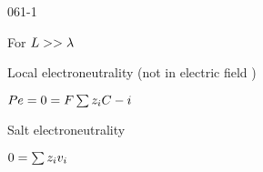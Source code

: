 \begin{mitframe}{061-1}
\begin{listone}
\begin{listtwo}
\begin{listthree}
\begin{listfour}
                                \item For $\length>>\wavel$
                                	\begin{listfive}
                                    	\item Local electroneutrality (not in electric field )
                                        \end{listfive}
                                        
                                        \item $\peclet=0=\force\sum\nolimits{z}_{\state}\conc-{\state}$
                                        
                  \end{listfour}
                  \end{listthree}
        \item Salt electroneutrality
        		\begin{listthree}
                		\item $0=\sum\nolimits{z}_{\state}\vvel_{\state}$
                \end{listthree}
                
        \end{listtwo}
\end{listone}
\end{mitframe}